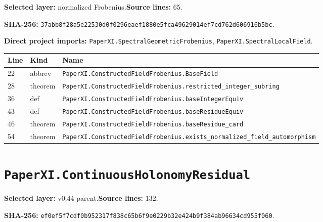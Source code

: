 \documentclass[10pt,oneside]{book}
\begin{document}
\textbf{Selected layer:} normalized Frobenius.\quad\textbf{Source lines:} 65.\par\textbf{SHA-256:} {\scriptsize\nolinkurl{37abb8f28a5e22530d0f0296eaef1880e5fca49629014ef7cd762d606916b5bc}}.


\textbf{Direct project imports:} \nolinkurl{PaperXI.SpectralGeometricFrobenius}, \nolinkurl{PaperXI.SpectralLocalField}.

\begin{longtable}{@{}p{}p{}p{}@{}}\toprule Line&Kind&Name\\\midrule\endhead

22&abbrev&\nolinkurl{PaperXI.ConstructedFieldFrobenius.BaseField}\\

28&theorem&\nolinkurl{PaperXI.ConstructedFieldFrobenius.restricted_integer_subring}\\

36&def&\nolinkurl{PaperXI.ConstructedFieldFrobenius.baseIntegerEquiv}\\

43&def&\nolinkurl{PaperXI.ConstructedFieldFrobenius.baseResidueEquiv}\\

46&theorem&\nolinkurl{PaperXI.ConstructedFieldFrobenius.baseResidue_card}\\

54&theorem&\nolinkurl{PaperXI.ConstructedFieldFrobenius.exists_normalized_field_automorphism}\\

\bottomrule\end{longtable}

\section{\texorpdfstring{\nolinkurl{PaperXI.ContinuousHolonomyResidual}}{PaperXI.ContinuousHolonomyResidual}}\label{module:PaperXI.ContinuousHolonomyResidual}

\textbf{Selected layer:} v0.44 parent.\quad\textbf{Source lines:} 132.\par\textbf{SHA-256:} {\scriptsize\nolinkurl{ef0ef5f7cdf0b952317f838c65b6f9e0229b32e424b9f384ab96634cd955f060}}.

\end{document}
